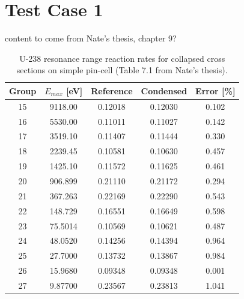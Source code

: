 \section{Test Case 1}
\label{sec:test-case1}

{\color{red} content to come from Nate's thesis, chapter 9?}

\begin{table}[h!]
  \centering
  \caption{U-238 resonance range reaction rates for collapsed cross sections on simple pin-cell {(\color{red}Table 7.1 from Nate's thesis)}.}
  \label{tab:case1-bias} 
  \begin{tabular}{c c c c c}
  \toprule
  Group & $E_{max}$ [eV] & Reference & Condensed & Error [\%] \\
  \midrule
  15 & 9118.00 & 0.12018 & 0.12030 & 0.102 \\
  16 & 5530.00 & 0.11011 & 0.11027 & 0.142 \\
  17 & 3519.10 & 0.11407 & 0.11444 & 0.330 \\
  18 & 2239.45 & 0.10581 & 0.10630 & 0.457 \\
  19 & 1425.10 & 0.11572 & 0.11625 & 0.461 \\
  20 & 906.899 & 0.21110 & 0.21172 & 0.294 \\
  21 & 367.263 & 0.22169 & 0.22290 & 0.543 \\
  22 & 148.729 & 0.16551 & 0.16649 & 0.598 \\
  23 & 75.5014 & 0.10569 & 0.10621 & 0.487 \\
  24 & 48.0520 & 0.14256 & 0.14394 & 0.964 \\
  25 & 27.7000 & 0.13732 & 0.13867 & 0.984 \\
  26 & 15.9680 & 0.09348 & 0.09348 & 0.001 \\
  27 & 9.87700 & 0.23567 & 0.23813 & 1.041 \\
  \bottomrule
\end{tabular}
\end{table}

